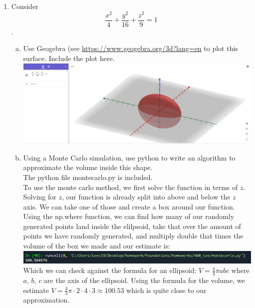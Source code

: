 \documentclass[12pt,letterpaper]{article}
\begin{document}
\begin{enumerate}
\item Consider $$\frac{x^2}{4} + \frac{y^2}{16} + \frac{z^2}{9}=1$$.
\begin{enumerate}[a)]
\item Use Geogebra  (see \url{https://www.geogebra.org/3d?lang=en}  to plot this surface. Include the plot here.\\
\includegraphics[scale = .3]{ellipsoid.png}\\
\item Using a Monte Carlo simulation, use python to write an algorithm to approximate the volume inside this shape.
\\The python file montecarlo.py is included. \\
To use the monte carlo method, we first solve the function in terms of $z$. Solving for 
$z$, our function is already split into above and below the $z$ axis. We can take 
one of those and create a box around our function. Using the np.where function, 
we can find how many of our randomly generated points land inside the elilpsoid, 
take that over the amount of points we have randomly generated, and multiply double 
that times the volume of the box we made and our estimate is: 
\includegraphics[scale = .8]{montecarlo.png}\\

Which we can check against the formula for an ellipsoid: $V = \frac{4}{3}\pi abc$ 
where $a$, $b$, $c$ are the axis of the ellipsoid. Using the formula for the volume, 
we estimate $V = \frac{4}{3}\pi \cdot 2\cdot4 \cdot3 \approx 100.53$ which is quite 
close to our approximation. 
\end{enumerate}


\end{enumerate}
\end{document}
